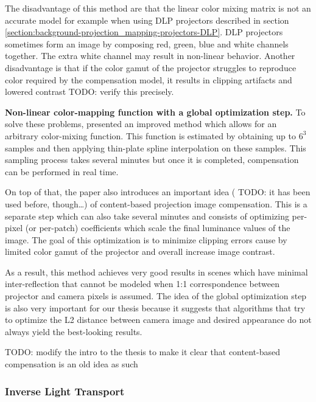 The disadvantage of this method are that the linear color mixing matrix is not an accurate model for example when using DLP projectors described in section \ref{section:background-projection_mapping-projectors-DLP}. DLP projectors sometimes form an image by composing red, green, blue and white channels together. The extra white channel may result in non-linear behavior. Another disadvantage is that if the color gamut of the projector struggles to reproduce color required by the compensation model, it results in clipping artifacts and lowered contrast {\color{red} TODO: verify this precisely}.

\textbf{Non-linear color-mapping function with a global optimization step.} To solve these problems, \citet{Grundhofer2015} presented an improved method which allows for an arbitrary color-mixing function. This function is estimated by obtaining up to \(6^3\) samples and then applying thin-plate spline interpolation on these samples. This sampling process takes several minutes but once it is completed, compensation can be performed in real time.

On top of that, the paper also introduces an important idea ({\color{red} TODO: it has been used before, though\dots}) of content-based projection image compensation. This is a separate step which can also take several minutes and consists of optimizing per-pixel (or per-patch) coefficients which scale the final luminance values of the image. The goal of this optimization is to minimize clipping errors cause by limited color gamut of the projector and overall increase image contrast.

As a result, this method achieves very good results in scenes which have minimal inter-reflection that cannot be modeled when 1:1 correspondence between projector and camera pixels is assumed. The idea of the global optimization step is also very important for our thesis because it suggests that algorithms that try to optimize the L2 distance between camera image and desired appearance do not always yield the best-looking results.

{\color{red} TODO: modify the intro to the thesis to make it clear that content-based compensation is an old idea as such}

\subsubsection{Inverse Light Transport}
\label{section:background-projection_mapping-procams-inverse_lt}

